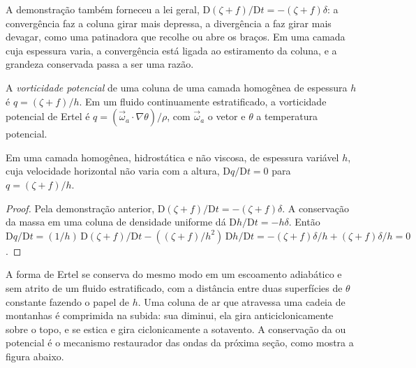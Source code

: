 A demonstração também forneceu a lei geral, $\mathrm D(\zeta + f)/\mathrm Dt =
-(\zeta + f)\delta$: a convergência faz a coluna girar mais depressa, a divergência a
faz girar mais devagar, como uma patinadora que recolhe ou abre os braços. Em uma
camada cuja espessura varia, a convergência está ligada ao estiramento da coluna,
e a grandeza conservada passa a ser uma razão.

\begin{definition}\label{def:b3:atmospheric-dynamics:pv}
A \emph{vorticidade potencial} de uma coluna de uma
camada homogênea de espessura $h$ é $q = (\zeta + f)/h$. Em um fluido continuamente
estratificado, a vorticidade potencial de Ertel é $q = (\vec\omega_a\cdot
\nabla\theta)/\rho$, com $\vec\omega_a$ o vetor  e
$\theta$ a temperatura potencial.
\end{definition}

\begin{theorem}\label{thm:b3:atmospheric-dynamics:pv}
Em uma camada homogênea, hidrostática e não viscosa, de espessura variável $h$, cuja
velocidade horizontal não varia com a altura, $\mathrm Dq/\mathrm Dt = 0$
para $q = (\zeta + f)/h$.
\end{theorem}

\begin{proof}
Pela demonstração anterior, $\mathrm D(\zeta + f)/\mathrm Dt = -(\zeta + f)\delta$.
A conservação da massa em uma coluna de densidade uniforme dá $\mathrm Dh/\mathrm
Dt = -h\delta$. Então $\mathrm Dq/\mathrm Dt = (1/h)\,\mathrm D(\zeta +
f)/\mathrm Dt - ((\zeta + f)/h^2)\,\mathrm Dh/\mathrm Dt = -(\zeta +
f)\delta/h + (\zeta + f)\delta/h = 0$.
\end{proof}

A forma de Ertel se conserva do mesmo modo em um escoamento adiabático e sem atrito
de um fluido estratificado, com a distância entre duas superfícies de
$\theta$ constante fazendo o papel de $h$. Uma coluna de ar que atravessa uma
cadeia de montanhas é comprimida na subida: sua  diminui, ela
gira anticiclonicamente sobre o topo, e se estica e gira
ciclonicamente a sotavento. A conservação da
 ou potencial é o mecanismo restaurador das ondas
da próxima seção, como mostra a figura abaixo.

